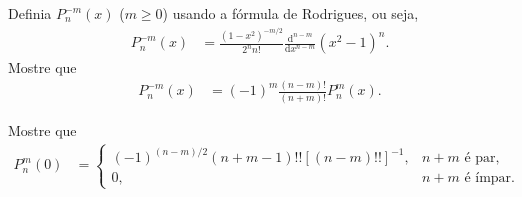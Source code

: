 \documentclass[a4paper,12pt, leqno, answers]{exam}
\begin{document}
\begin{questions}
\begin{parts}
\begin{solution}
        \end{solution}
    \end{parts}

    \question Definia $P_n^{-m}(x)$ ($m \geq 0$) usando a f\'{o}rmula de Rodrigues, ou seja,
    \begin{align*}
        P_n^{-m}(x) &= \frac{(1 - x^2)^{-m/2}}{2^n n!} \frac{\mathrm{d}^{n - m}}{\mathrm{d}x^{n - m}}\left( x^2 - 1 \right)^n.
    \end{align*}
    Mostre que
    \begin{align*}
        P_n^{-m}(x) &= (-1)^m \frac{(n - m)!}{(n + m)!} P_n^m(x).
    \end{align*}
    \begin{solution}
        
    \end{solution}

    \question Mostre que
    \begin{align*}
        P_n^m(0) &= \begin{cases}
            (-1)^{(n - m)/2} (n + m - 1)!! \left[ (n - m)!! \right]^{-1}, & \text{$n + m$ \'{e} par,} \\
            0, & \text{$n + m$ \'{e} \'{i}mpar.}
        \end{cases}
    \end{align*}
    \begin{solution}
        
    \end{solution}


\end{questions}
\end{document}
